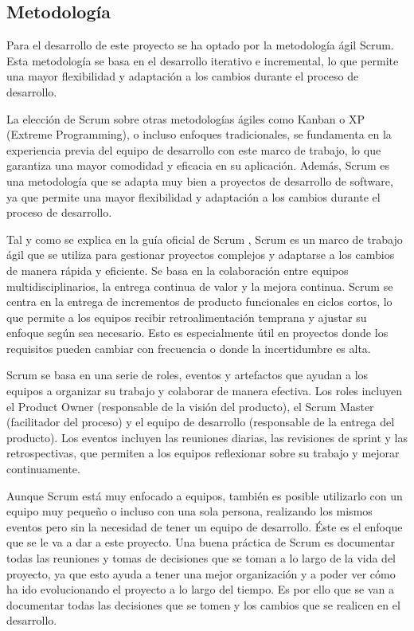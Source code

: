\subsection{Metodología}
\label{sec:metodologia}

Para el desarrollo de este proyecto se ha optado por la metodología ágil Scrum. Esta metodología se basa en el desarrollo iterativo e incremental, lo que permite una mayor flexibilidad y adaptación a los cambios durante el proceso de desarrollo.

La elección de Scrum sobre otras metodologías ágiles como Kanban o XP (Extreme Programming), o incluso enfoques tradicionales, se fundamenta en la experiencia previa del equipo de desarrollo con este marco de trabajo, lo que garantiza una mayor comodidad y eficacia en su aplicación.
Además, Scrum es una metodología que se adapta muy bien a proyectos de desarrollo de software, ya que permite una mayor flexibilidad y adaptación a los cambios durante el proceso de desarrollo.

Tal y como se explica en la guía oficial de Scrum \parencite{scrum-guide}, Scrum es un marco de trabajo ágil que se utiliza para gestionar proyectos complejos y adaptarse a los cambios de manera rápida y eficiente. Se basa en la colaboración entre equipos multidisciplinarios, la entrega continua de valor y la mejora continua.
Scrum se centra en la entrega de incrementos de producto funcionales en ciclos cortos, lo que permite a los equipos recibir retroalimentación temprana y ajustar su enfoque según sea necesario. Esto es especialmente útil en proyectos donde los requisitos pueden cambiar con frecuencia o donde la incertidumbre es alta.

Scrum se basa en una serie de roles, eventos y artefactos que ayudan a los equipos a organizar su trabajo y colaborar de manera efectiva. Los roles incluyen el Product Owner (responsable de la visión del producto), el Scrum Master (facilitador del proceso) y el equipo de desarrollo (responsable de la entrega del producto). Los eventos incluyen las reuniones diarias, las revisiones de sprint y las retrospectivas, que permiten a los equipos reflexionar sobre su trabajo y mejorar continuamente.

Aunque Scrum está muy enfocado a equipos, también es posible utilizarlo con un equipo muy pequeño o incluso con una sola persona, realizando los mismos eventos pero sin la necesidad de tener un equipo de desarrollo.
Éste es el enfoque que se le va a dar a este proyecto. Una buena práctica de Scrum es documentar todas las reuniones y tomas de decisiones que se toman a lo largo de la vida del proyecto, ya que esto ayuda a tener una mejor organización y a poder ver cómo ha ido evolucionando el proyecto a lo largo del tiempo.
Es por ello que se van a documentar todas las decisiones que se tomen y los cambios que se realicen en el desarrollo.


